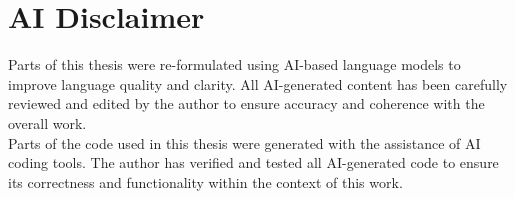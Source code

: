 \newpage
\thispagestyle{empty}
\section*{AI Disclaimer}
\thispagestyle{empty}
Parts of this thesis were re-formulated using AI-based language models to improve language quality and clarity. All AI-generated content has been carefully reviewed and edited by the author to ensure accuracy and coherence with the overall work.
\vspace{4\baselineskip}\\
Parts of the code used in this thesis were generated with the assistance of AI coding tools. The author has verified and tested all AI-generated code to ensure its correctness and functionality within the context of this work.